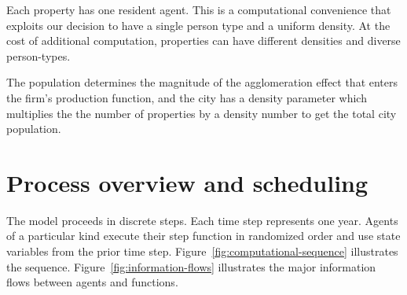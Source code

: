 Each property has one resident agent. This is a computational convenience that exploits our decision to have a single person type and a uniform density. At the cost of additional computation, properties can have different densities and diverse person-types.

The population determines the magnitude of the agglomeration effect that enters the firm's production function, and the city has a density parameter which multiplies the the number of properties by a density number to get the total city population. 






\section{Process overview and scheduling}

The model proceeds in discrete steps. Each time step represents one year. Agents of a particular kind execute their step function in randomized order and use state variables from the prior time step. Figure~\ref{fig:computational-sequence} illustrates the sequence. Figure~\ref{fig:information-flows} illustrates the major information flows between agents and functions.

